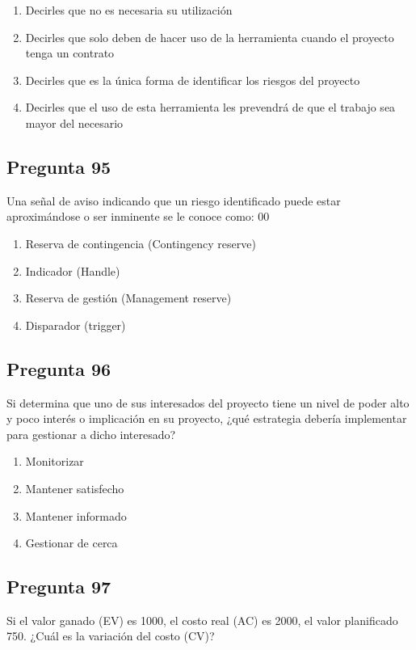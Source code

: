 \documentclass[11pt,a4paper]{article}
\begin{document}
\begin{enumerate}[label=\alph*)]
  \item Decirles que no es necesaria su utilización
  \item Decirles que solo deben de hacer uso de la herramienta cuando el proyecto tenga un contrato
  \item Decirles que es la única forma de identificar los riesgos del proyecto
  \item Decirles que el uso de esta herramienta les prevendrá de que el trabajo sea mayor del necesario
\end{enumerate}

\subsection*{Pregunta 95}
Una señal de aviso indicando que un riesgo identificado puede estar aproximándose o ser inminente se le conoce como: 00

\begin{enumerate}[label=\alph*)]
  \item Reserva de contingencia (Contingency reserve)
  \item Indicador (Handle)
  \item Reserva de gestión (Management reserve)
  \item Disparador (trigger)
\end{enumerate}

\subsection*{Pregunta 96}
Si determina que uno de sus interesados del proyecto tiene un nivel de poder alto y poco interés o implicación en su proyecto, ¿qué estrategia debería implementar para gestionar a dicho interesado?

\begin{enumerate}[label=\alph*)]
  \item Monitorizar
  \item Mantener satisfecho
  \item Mantener informado
  \item Gestionar de cerca
\end{enumerate}

\subsection*{Pregunta 97}
Si el valor ganado (EV) es 1000, el costo real (AC) es 2000, el valor planificado 750. ¿Cuál es la variación del costo (CV)?
\end{document}
